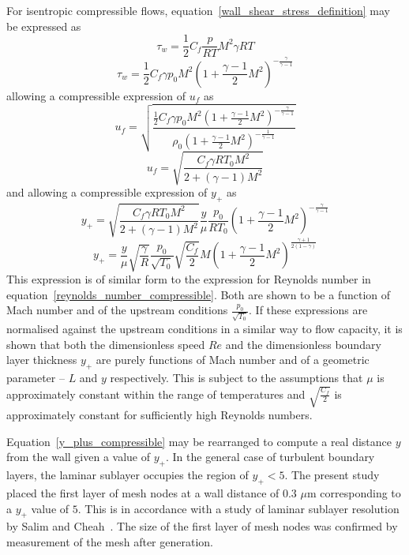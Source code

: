 \documentclass[a4paper, 11pt, oneside]{report}
\begin{document}
For isentropic compressible flows, equation~\ref{wall_shear_stress_definition} may be expressed as
\begin{equation}
\tau_w =
\frac{1}{2}
C_f
\frac{p}{RT}
M^2
\gamma
RT
\end{equation}
\begin{equation}
\tau_w =
\frac{1}{2}
C_f
\gamma
p_0
M^2
\left(
	1 +
	\frac{\gamma-1}{2}
	M^2
\right)
^{-\frac{\gamma}{\gamma-1}}
\end{equation}
allowing a compressible expression of $u_f$ as
\begin{equation}
u_f = 
\sqrt{
	\frac{
		\frac{1}{2}
		C_f
		\gamma
		p_0
		M^2
		\left(
			1 +
			\frac{\gamma-1}{2}
			M^2
		\right)
		^{-\frac{\gamma}{\gamma-1}}
	}{
		\rho_0
		\left(
			1 +
			\frac{\gamma-1}{2}
			M^2
		\right)
		^{-\frac{1}{\gamma-1}}
	}
}
\end{equation}
\begin{equation}
u_f = 
\sqrt{
	\frac{
		C_f
		\gamma
		R
		T_0
		M^2
	}{
		2 +
		\left(\gamma-1\right)
		M^2
	}
}
\end{equation}
and allowing a compressible expression of $y_+$ as
\begin{equation}
y_+ = 
\sqrt{
	\frac{
		C_f
		\gamma
		R
		T_0
		M^2
	}{
		2 +
		\left(\gamma-1\right)
		M^2
	}
}
\frac{y}{\mu}
\frac{p_0}{R T_0}
\left(
	1 +
	\frac{\gamma-1}{2}
	M^2
\right)
^{-\frac{\gamma}{\gamma-1}}
\end{equation}
\begin{equation}\label{y_plus_compressible}
y_+ =
\frac{y}{\mu}
\sqrt{\frac{\gamma}{R}}
\frac{p_0}{\sqrt{T_0}}
\sqrt{\frac{C_f}{2}}
M
\left(
	1 +
	\frac{\gamma-1}{2}
	M^2
\right)
^{\frac{\gamma+1}{2(1-\gamma)}}
\end{equation}
This expression is of similar form to the expression for Reynolds number in equation~\ref{reynolds_number_compressible}. Both are shown to be a function of Mach number and of the upstream conditions $\frac{p_0}{\sqrt{T_0}}$. If these expressions are normalised against the upstream conditions in a similar way to flow capacity, it is shown that both the dimensionless speed $Re$ and the dimensionless boundary layer thickness $y_+$ are purely functions of Mach number and of a geometric parameter -- $L$ and $y$ respectively. This is subject to the assumptions that $\mu$ is approximately constant within the range of temperatures and $\sqrt{\frac{C_f}{2}}$ is approximately constant for sufficiently high Reynolds numbers.

Equation~\ref{y_plus_compressible} may be rearranged to compute a real distance $y$ from the wall given a value of $y_+$. In the general case of turbulent boundary layers, the laminar sublayer occupies the region of $y_+ < 5$. The present study placed the first layer of mesh nodes at a wall distance of $0.3$ $\mu$m corresponding to a $y_+$ value of $5$. This is in accordance with a study of laminar sublayer resolution by Salim and Cheah~\cite{salim_y_plus}. The size of the first layer of mesh nodes was confirmed by measurement of the mesh after generation.
\end{document}
